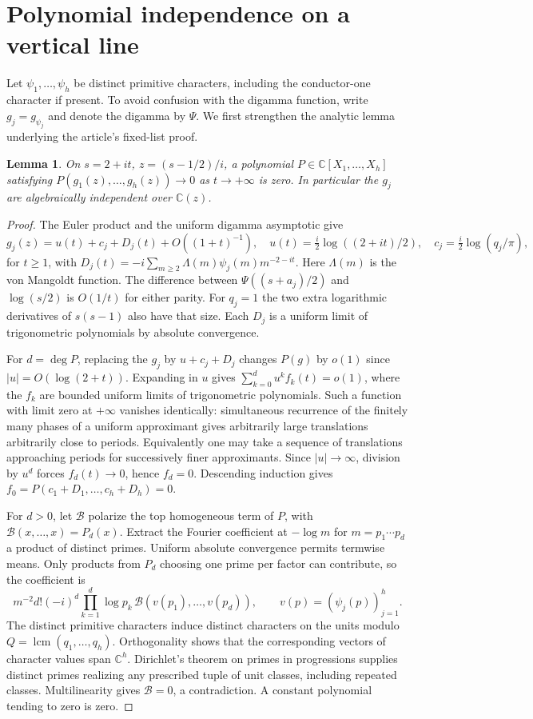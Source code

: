 \documentclass[11pt]{article}
\newtheorem{lemma}[theorem]{Lemma}
\theoremstyle{remark}\newtheorem{remark}[theorem]{Remark}
\DeclareMathOperator{\lcm}{lcm}
\newcommand{\C}{\mathbb C}\newcommand{\R}{\mathbb R}
\begin{document}
\section{Polynomial independence on a vertical line}
Let $\psi_1,\ldots,\psi_h$ be distinct primitive characters, including the conductor-one character if present. To avoid confusion with the digamma function, write $g_j=g_{\psi_j}$ and denote the digamma by $\Psi$. We first strengthen the analytic lemma underlying the article's fixed-list proof.
\begin{lemma}\label{lem:ap}
On $s=2+it$, $z=(s-1/2)/i$, a polynomial $P\in\C[X_1,\ldots,X_h]$ satisfying $P(g_1(z),\ldots,g_h(z))\to0$ as $t\to+\infty$ is zero. In particular the $g_j$ are algebraically independent over $\C(z)$.
\end{lemma}
\begin{proof}
The Euler product and the uniform digamma asymptotic give
\[
 g_j(z)=u(t)+c_j+D_j(t)+O((1+t)^{-1}),\quad
 u(t)=\tfrac i2\log((2+it)/2),\quad c_j=\tfrac i2\log(q_j/\pi),
\]
for $t\ge1$, with $D_j(t)=-i\sum_{m\ge2}\Lambda(m)\psi_j(m)m^{-2-it}$. Here $\Lambda(m)$ is the von Mangoldt function. The difference between $\Psi((s+a_j)/2)$ and $\log(s/2)$ is $O(1/t)$ for either parity. For $q_j=1$ the two extra logarithmic derivatives of $s(s-1)$ also have that size. Each $D_j$ is a uniform limit of trigonometric polynomials by absolute convergence.

For $d=\deg P$, replacing the $g_j$ by $u+c_j+D_j$ changes $P(g)$ by $o(1)$ since $|u|=O(\log(2+t))$. Expanding in $u$ gives $\sum_{k=0}^d u^k f_k(t)=o(1)$, where the $f_k$ are bounded uniform limits of trigonometric polynomials. Such a function with limit zero at $+\infty$ vanishes identically: simultaneous recurrence of the finitely many phases of a uniform approximant gives arbitrarily large translations arbitrarily close to periods. Equivalently one may take a sequence of translations approaching periods for successively finer approximants. Since $|u|\to\infty$, division by $u^d$ forces $f_d(t)\to0$, hence $f_d=0$. Descending induction gives $f_0=P(c_1+D_1,\ldots,c_h+D_h)=0$.

For $d>0$, let $\mathcal B$ polarize the top homogeneous term of $P$, with $\mathcal B(x,\ldots,x)=P_d(x)$. Extract the Fourier coefficient at $-\log m$ for $m=p_1\cdots p_d$ a product of distinct primes. Uniform absolute convergence permits termwise means. Only products from $P_d$ choosing one prime per factor can contribute, so the coefficient is
\[
 m^{-2}d!(-i)^d\prod_{k=1}^d\log p_k\,
 \mathcal B(v(p_1),\ldots,v(p_d)),\qquad v(p)=(\psi_j(p))_{j=1}^h.
\]
The distinct primitive characters induce distinct characters on the units modulo $Q=\lcm(q_1,\dots,q_h)$. Orthogonality shows that the corresponding vectors of character values span $\C^h$. Dirichlet's theorem on primes in progressions supplies distinct primes realizing any prescribed tuple of unit classes, including repeated classes. Multilinearity gives $\mathcal B=0$, a contradiction. A constant polynomial tending to zero is zero.


\end{proof}
\end{document}
